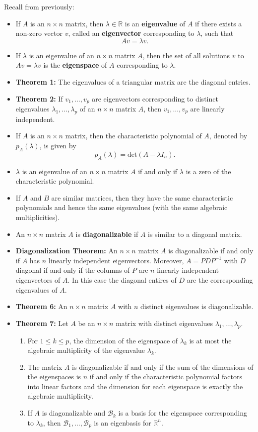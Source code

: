 \documentclass[12pt,letterpaper]{article}
\begin{document}
\thispagestyle{fancy}

Recall from previously:

\begin{itemize}
\item If $A$ is an $n \times n$ matrix, then $\lambda \in \mathbb{R}$ is an {\bf eigenvalue} of $A$ if there exists a non-zero vector $v$, called an {\bf eigenvector} corresponding to $\lambda$, such that $$Av=\lambda v.$$
\item If $\lambda$ is an eigenvalue of an $n \times n$ matrix $A$, then the set of all solutions $v$ to $Av = \lambda v$ is the {\bf eigenspace} of $A$ corresponding to $\lambda$.
\item {\bf Theorem 1:} The eigenvalues of a triangular matrix are the diagonal entries.
\item {\bf Theorem 2:} If $v_1, \dots, v_p$ are eigenvectors corresponding to distinct eigenvalues $\lambda_1, \dots, \lambda_p$ of an $n\times n$ matrix $A$, then $v_1, \dots, v_p$ are linearly independent.
\item If $A$ is an $n\times n$ matrix, then the characteristic polynomial of $A$, denoted by $p_A(\lambda)$, is given by $$p_A(\lambda)=\text{det}(A-\lambda I_n).$$
\item $\lambda$ is an eigenvalue of an $n\times n$ matrix $A$ if and only if $\lambda$ is a zero of the characteristic polynomial.
\item If $A$ and $B$ are similar matrices, then they have the same characteristic polynomials and hence the same eigenvalues (with the same algebraic multiplicities). 
\item An $n\times n$ matrix $A$ is {\bf diagonalizable} if $A$ is similar to a diagonal matrix.
\item {\bf Diagonalization Theorem:} An $n \times n$ matrix $A$ is diagonalizable if and only if $A$ has $n$ linearly independent eigenvectors. Moreover, $A=PDP^{-1}$ with $D$ diagonal if and only if the columns of $P$ are $n$ linearly independent eigenvectors of $A$. In this case the diagonal entires of $D$ are the corresponding eigenvalues of $A$.
\item {\bf Theorem 6:} An $n \times n$ matrix $A$ with $n$ distinct eigenvalues is diagonalizable.
\item 
{\bf Theorem 7:} Let $A$ be an $n\times n$ matrix with distinct eigenvalues $\lambda_1, \dots, \lambda_p$.
\begin{enumerate}
\item For $1\leq k \leq p$, the dimension of the eigenspace of $\lambda_k$ is at most the algebraic multiplicity of the eigenvalue $\lambda_k$.
\item The matrix $A$ is diagonalizable if and only if the sum of the dimensions of the eigenspaces is $n$ if and only if the characteristic polynomial factors into linear factors and the dimension for each eigenspace is exactly the algebraic multiplicity.
\item If $A$ is diagonalizable and $\mathcal{B}_k$ is a basis for the eigenspace corresponding to $\lambda_k$, then $\mathcal{B}_1, \dots, \mathcal{B}_p$ is an eigenbasis for $\mathbb{R}^n$.
\end{enumerate}
\end{itemize}
\end{document}
